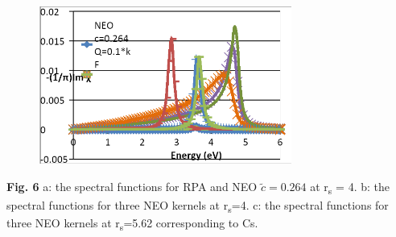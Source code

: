 \documentclass[12pt]{article}
\renewcommand{\_}{\kern-1.5pt\textunderscore\kern-1.5pt}
\begin{document}

\setlength{\parskip}{0.0pt}
\par


\vspace{\baselineskip}
\setlength{\parskip}{9.96pt}

\vspace{\baselineskip}
\setlength{\parskip}{0.0pt}
\setlength{\parskip}{9.96pt}



\begin{figure}[H]
	\begin{Center}
		\includegraphics[width=3.27in,height=2.04in]{./media/image4.png}
	\end{Center}
\end{figure}



\setlength{\parskip}{0.0pt}
\par


\vspace{\baselineskip}
\setlength{\parskip}{9.96pt}

\vspace{\baselineskip}
\setlength{\parskip}{0.0pt}
\setlength{\parskip}{9.96pt}

\vspace{\baselineskip}
\setlength{\parskip}{0.0pt}
\setlength{\parskip}{9.96pt}
\setlength{\parskip}{0.0pt}
\begin{justify}
\textbf{Fig. 6 }a: the spectral functions for RPA and NEO\textbf{  \( \widetilde{c}=0.264 \) } at r\textsubscript{s }= 4. b: the spectral functions for three NEO kernels at r\textsubscript{s}=4. c: the spectral functions for three NEO kernels at r\textsubscript{s}=5.62 corresponding to Cs.
\end{justify}\par
\end{document}
